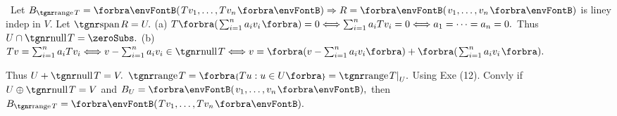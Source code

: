 \BulletPointX{}\,\,\,Let $B_{\range T}=\Par{Tv_1,\dots,Tv_n}\Rightarrow R=\Par{v_1,\dots,v_n}$ is liney indep in $V.$ Let $\spn R=U.$\TextB{\vspace{3pt}}
(a) $T{\BigBigPar{{\sum_{i=1}^n a_i v_i}}}=0\Longleftrightarrow\sum_{i=1}^n a_i Tv_i=0\Longleftrightarrow a_1=\dots=a_n=0.$ Thus $U\cap\null T=\zeroSubs.$\TextB{\vspace{4pt}}
(b) $Tv=\sum_{i=1}^n a_i Tv_i\Longleftrightarrow v-\sum_{i=1}^n a_i v_i\in\null T\Longleftrightarrow v=\BigBigPar[0pt]{v-\sum_{i=1}^n a_i v_i}+\BigBigPar{{\sum_{i=1}^n a_i v_i}}.$\par\vspace{2pt}\IndentB{}\Hb{}
Thus $U+\null T=V.$ \;\Or $\range T=\Bra{Tu:u\in U}=\range T\mmid_U.$ Using Exe (12).\PfEnd\vspace{4pt}
\ACoro Convly if $U\oplus\null T=V$ and $B_U=\Par{v_1,\dots,v_n},$ then $B_{\range T}=\Par{Tv_1,\dots,Tv_n}.$
\SepLine

\SepLine



